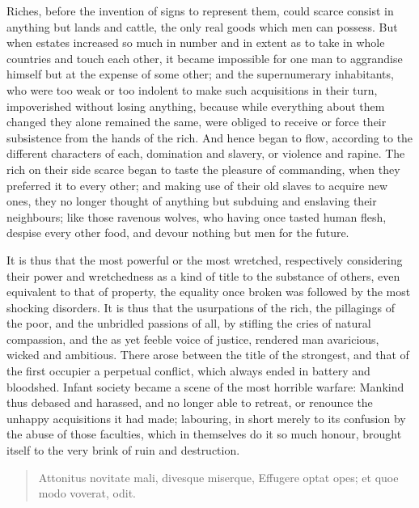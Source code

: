 \documentclass[11pt,twocolumn]{ltugboat}
\begin{document}
Riches, before the invention of signs to represent them, could scarce
consist in anything but lands and cattle, the only real goods which
men can possess. But when estates increased so much in number and in
extent as to take in whole countries and touch each other, it became
impossible for one man to aggrandise himself but at the expense of
some other; and the supernumerary inhabitants, who were too weak or
too indolent to make such acquisitions in their turn, impoverished
without losing anything, because while everything about them changed
they alone remained the same, were obliged to receive or force their
subsistence from the hands of the rich. And hence began to flow,
according to the different characters of each, domination and slavery,
or violence and rapine. The rich on their side scarce began to taste
the pleasure of commanding, when they preferred it to every other; and
making use of their old slaves to acquire new ones, they no longer
thought of anything but subduing and enslaving their neighbours; like
those ravenous wolves, who having once tasted human flesh, despise
every other food, and devour nothing but men for the future.

It is thus that the most powerful or the most wretched, respectively
considering their power and wretchedness as a kind of title to the
substance of others, even equivalent to that of property, the equality
once broken was followed by the most shocking disorders. It is thus
that the usurpations of the rich, the pillagings of the poor, and the
unbridled passions of all, by stifling the cries of natural
compassion, and the as yet feeble voice of justice, rendered man
avaricious, wicked and ambitious. There arose between the title of the
strongest, and that of the first occupier a perpetual conflict, which
always ended in battery and bloodshed. Infant society became a scene
of the most horrible warfare: Mankind thus debased and harassed, and
no longer able to retreat, or renounce the unhappy acquisitions it had
made; labouring, in short merely to its confusion by the abuse of
those faculties, which in themselves do it so much honour, brought
itself to the very brink of ruin and destruction.

\begin{quotation}
\textlatin{%
  Attonitus novitate mali, divesque miserque,
  Effugere optat opes; et quoe modo voverat, odit.
}
\end{quotation}
\end{document}
